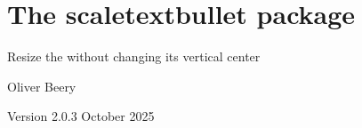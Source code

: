 \documentclass{article}
\begin{document}
\section*{\Large The \textsf{scaletextbullet} package}

Resize the \texttt{\string\textbullet} without changing its vertical center

Oliver Beery

Version 2.0.3 October 2025

\end{document}
